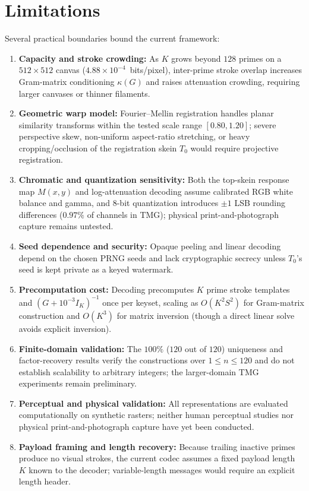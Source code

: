 \documentclass[]{interact}
\theoremstyle{plain}
\theoremstyle{definition}
\theoremstyle{remark}
\begin{document}
\section{Limitations}
Several practical boundaries bound the current framework:
\begin{enumerate}
  \item \textbf{Capacity and stroke crowding:} As $K$ grows beyond $128$ primes on a $512 \times 512$ canvas ($4.88 \times 10^{-4}$~bits/pixel), inter-prime stroke overlap increases Gram-matrix conditioning $\kappa(G)$ and raises attenuation crowding, requiring larger canvases or thinner filaments.
  \item \textbf{Geometric warp model:} Fourier--Mellin registration handles planar similarity transforms within the tested scale range $[0.80, 1.20]$; severe perspective skew, non-uniform aspect-ratio stretching, or heavy cropping/occlusion of the registration skein $T_0$ would require projective registration.
  \item \textbf{Chromatic and quantization sensitivity:} Both the top-skein response map $M(x,y)$ and log-attenuation decoding assume calibrated RGB white balance and gamma, and 8-bit quantization introduces $\pm 1$ LSB rounding differences ($0.97\%$ of channels in TMG); physical print-and-photograph capture remains untested.
  \item \textbf{Seed dependence and security:} Opaque peeling and linear decoding depend on the chosen PRNG seeds and lack cryptographic secrecy unless $T_0$'s seed is kept private as a keyed watermark.
  \item \textbf{Precomputation cost:} Decoding precomputes $K$ prime stroke templates and $(G + 10^{-3}I_K)^{-1}$ once per keyset, scaling as $O(K^2 S^2)$ for Gram-matrix construction and $O(K^3)$ for matrix inversion (though a direct linear solve avoids explicit inversion).
  \item \textbf{Finite-domain validation:} The $100\%$ ($120$ out of $120$) uniqueness and factor-recovery results verify the constructions over $1 \le n \le 120$ and do not establish scalability to arbitrary integers; the larger-domain TMG experiments remain preliminary.
  \item \textbf{Perceptual and physical validation:} All representations are evaluated computationally on synthetic rasters; neither human perceptual studies nor physical print-and-photograph capture have yet been conducted.
  \item \textbf{Payload framing and length recovery:} Because trailing inactive primes produce no visual strokes, the current codec assumes a fixed payload length $K$ known to the decoder; variable-length messages would require an explicit length header.
\end{enumerate}
\end{document}
